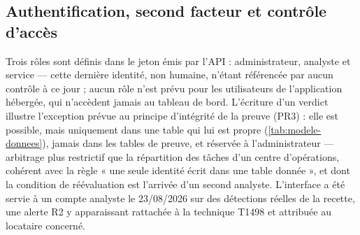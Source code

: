 \subsection{Authentification, second facteur et contrôle d'accès}
\label{subsec:authent-dashboard}

Trois rôles sont définis dans le jeton émis par l'API : administrateur, analyste et service ---
cette dernière identité, non humaine, n'étant référencée par aucun contrôle à ce jour ; aucun rôle
n'est prévu pour les utilisateurs de l'application hébergée, qui n'accèdent jamais au tableau de
bord. L'écriture d'un verdict illustre l'exception prévue au principe d'intégrité de la preuve
(PR3) : elle est possible, mais uniquement dans une table qui lui est propre
(\cref{tab:modele-donnees}), jamais dans les tables de preuve, et réservée à l'administrateur ---
arbitrage plus restrictif que la répartition des tâches d'un centre d'opérations, cohérent avec la
règle « une seule identité écrit dans une table donnée », et dont la condition de réévaluation est
l'arrivée d'un second analyste. L'interface a été servie à un compte analyste le 23/08/2026 sur des
détections réelles de la recette, une alerte R2 y apparaissant rattachée à la technique T1498 et
attribuée au locataire concerné.

